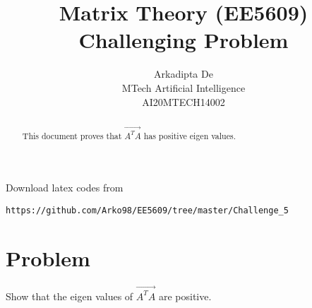 \documentclass[journal,12pt,twocolumn]{IEEEtran}
\begin{document}
     \def\rightbox#1{\makebox[0in][r]{#1}}
     \def\centbox#1{\makebox[0in]{#1}}
     \def\topbox#1{\raisebox{-\baselineskip}[0in][0in]{#1}}
     \def\midbox#1{\raisebox{-0.5\baselineskip}[0in][0in]{#1}}
\vspace{3cm}
\title{Matrix Theory (EE5609) Challenging Problem}
\author{Arkadipta De\\MTech Artificial Intelligence\\AI20MTECH14002}
\maketitle
\newpage
\bigskip
\renewcommand{\thefigure}{\theenumi}
\renewcommand{\thetable}{\theenumi}
\begin{abstract}
This document proves that $\vec{A^TA}$ has positive eigen values.
\end{abstract}
Download latex codes from 
%
\begin{lstlisting}
https://github.com/Arko98/EE5609/tree/master/Challenge_5
\end{lstlisting}
%
\section{Problem}
Show that the eigen values of $\vec{A^TA}$ are positive. 
\end{document}

